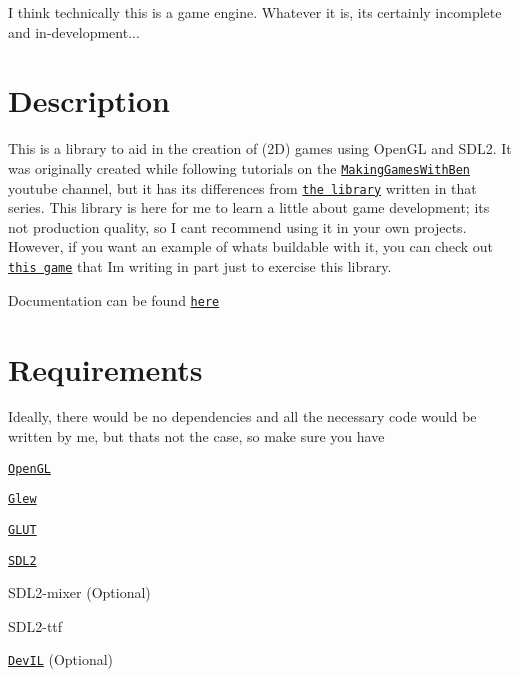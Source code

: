 I think technically this is a game engine. Whatever it is, it\textquotesingle{}s certainly incomplete and in-\/development...

\section*{Description}

This is a library to aid in the creation of (2D) games using Open\+GL and S\+D\+L2. It was originally created while following tutorials on the \href{https://www.youtube.com/channel/UCL5m1_llmeiAdZMo_ZanIvg}{\tt Making\+Games\+With\+Ben} youtube channel, but it has its differences from \href{https://github.com/Barnold1953/GraphicsTutorials}{\tt the library} written in that series. This library is here for me to learn a little about game development; it\textquotesingle{}s not production quality, so I can\textquotesingle{}t recommend using it in your own projects. However, if you want an example of what\textquotesingle{}s buildable with it, you can check out \href{https://github.com/NivenT/Planet}{\tt this game} that I\textquotesingle{}m writing in part just to exercise this library.

Documentation can be found \href{https://nivent.github.io/jubilant-funicular/html/index.html}{\tt here}

\section*{Requirements}

Ideally, there would be no dependencies and all the necessary code would be written by me, but that\textquotesingle{}s not the case, so make sure you have


\begin{DoxyItemize}
\item \href{https://www.opengl.org/}{\tt Open\+GL}
\begin{DoxyItemize}
\item \href{http://glew.sourceforge.net/}{\tt Glew}
\item \href{http://freeglut.sourceforge.net/}{\tt G\+L\+UT}
\end{DoxyItemize}
\item \href{https://www.libsdl.org/download-2.0.php}{\tt S\+D\+L2}
\begin{DoxyItemize}
\item S\+D\+L2-\/mixer (Optional)
\item S\+D\+L2-\/ttf
\end{DoxyItemize}
\item \href{http://openil.sourceforge.net/}{\tt Dev\+IL} (Optional)
\end{DoxyItemize}

